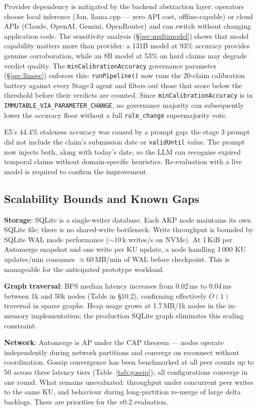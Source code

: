 \documentclass[10pt,twocolumn]{article}
\begin{document}
Provider dependency is mitigated by the backend abstraction layer: operators
choose local inference (Jan, llama.cpp — zero API cost, offline-capable) or
cloud APIs (Claude, OpenAI, Gemini, OpenRouter) and can switch without
changing application code. The sensitivity analysis (§\ref{sec:multimodel})
shows that model capability matters more than provider: a 131B model at
93\% accuracy provides genuine corroboration, while an 8B model at 53\%
on hard claims may degrade verdict quality. The
\texttt{minCalibrationAccuracy} governance parameter (§\ref{sec:llmsec})
enforces this: \texttt{runPipeline()} now runs the 20-claim calibration
battery against every Stage\,3 agent and filters out those that score below
the threshold before their verdicts are counted. Since
\texttt{minCalibrationAccuracy} is in
\texttt{IMMUTABLE\_VIA\_PARAMETER\_CHANGE}, no governance majority can
subsequently lower the accuracy floor without a full \texttt{rule\_change}
supermajority vote.

E5's 44.4\% staleness accuracy was caused by a prompt gap: the stage 3
prompt did not include the claim's submission date or \texttt{validUntil}
value. The prompt now injects both, along with today's date, so the LLM
can recognise expired temporal claims without domain-specific heuristics.
Re-evaluation with a live model is required to confirm the improvement.

\subsection{Scalability Bounds and Known Gaps}

\textbf{Storage}: SQLite is a single-writer database. Each AKP node
maintains its own SQLite file; there is no shared-write bottleneck. Write
throughput is bounded by SQLite WAL mode performance ($\sim$10\,k writes/s
on NVMe). At 1\,KiB per Automerge snapshot and one write per KU update,
a node handling 1\,000 KU updates/min consumes $\approx$60\,MB/min of WAL
before checkpoint. This is manageable for the anticipated prototype workload.

\textbf{Graph traversal}: BFS median latency increases from 0.02\,ms to
0.04\,ms between 1k and 50k nodes (Table in §10.2), confirming effectively
$O(1)$ traversal in sparse graphs. Heap usage grows at 1.7\,MB/1k nodes
in the in-memory implementation; the production SQLite graph eliminates
this scaling constraint.

\textbf{Network}: Automerge is AP under the CAP theorem — nodes operate
independently during network partitions and converge on reconnect without
coordination. Gossip convergence has been benchmarked at all peer counts
up to 50 across three latency tiers (Table~\ref{tab:gossip}); all
configurations converge in one round. What remains unevaluated:
throughput under concurrent peer writes to the same KU, and behaviour
during long-partition re-merge of large delta backlogs. These are
priorities for the v0.2 evaluation.
\end{document}
